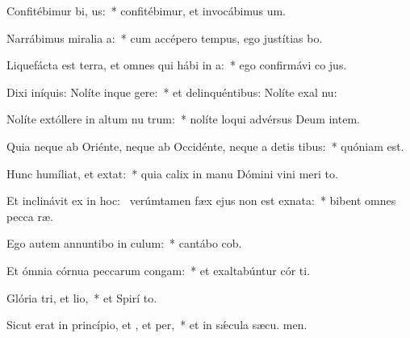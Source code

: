 \item Confitébimur bi, us:~* confitébimur, et invocábimus  um.
\item Narrábimus miralia a:~* cum accépero tempus, ego justítias bo.
\item Liquefácta est terra, et omnes qui hábi in a:~* ego confirmávi co jus.
\item Dixi iníquis: Nolíte inque gere:~* et delinquéntibus: Nolíte exal nu:
\item Nolíte extóllere in altum nu trum:~* nolíte loqui advérsus Deum intem.
\item Quia neque ab Oriénte, neque ab Occidénte, neque a detis tibus:~* quóniam   est.
\item Hunc humíliat, et  extat:~* quia calix in manu Dómini vini meri  to.
\item Et inclinávit ex  in hoc:~\pscross{} verúmtamen fæx ejus non est exnata:~* bibent omnes pecca ræ.
\item Ego autem annuntibo in culum:~* cantábo  cob.
\item Et ómnia córnua peccarum congam:~* et exaltabúntur cór ti.
\item Glória tri, et lio,~* et Spirí to.
\item Sicut erat in princípio, et , et per,~* et in sǽcula sæcu. men.

